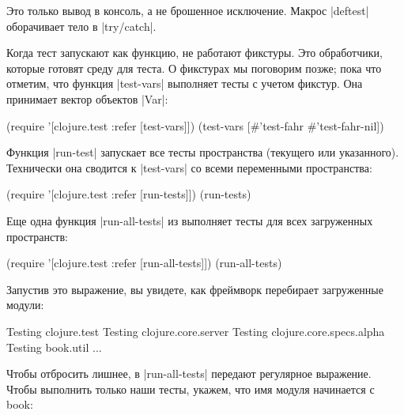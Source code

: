 Это только вывод в консоль, а не брошенное исключение. Макрос \spverb|deftest|
оборачивает тело в \spverb|try/catch|.

Когда тест запускают как функцию, не работают фикстуры. Это обработчики, которые
готовят среду для теста. О фикстурах мы поговорим позже; пока что отметим, что
функция \spverb|test-vars| выполняет тесты с учетом фикстур. Она принимает
вектор объектов \spverb|Var|:

\begin{english}
  \begin{clojure}
(require '[clojure.test :refer [test-vars]])
(test-vars [#'test-fahr #'test-fahr-nil])
  \end{clojure}
\end{english}

Функция \spverb|run-test| запускает все тесты пространства (текущего или
указанного). Технически она сводится к \spverb|test-vars| со всеми переменными
пространства:

\begin{english}
  \begin{clojure}
(require '[clojure.test :refer [run-tests]])
(run-tests)
  \end{clojure}
\end{english}

Еще одна функция \spverb|run-all-tests| из выполняет тесты для всех загруженных
пространств:

\begin{english}
  \begin{clojure}
(require '[clojure.test :refer [run-all-tests]])
(run-all-tests)
  \end{clojure}
\end{english}

Запустив это выражение, вы увидете, как фреймворк перебирает загруженные модули:

\begin{english}
  \begin{text}
Testing clojure.test
Testing clojure.core.server
Testing clojure.core.specs.alpha
Testing book.util
...
  \end{text}
\end{english}

Чтобы отбросить лишнее, в \spverb|run-all-tests| передают регулярное выражение.
Чтобы выполнить только наши тесты, укажем, что имя модуля начинается с book:

\begin{english}
\end{english}

